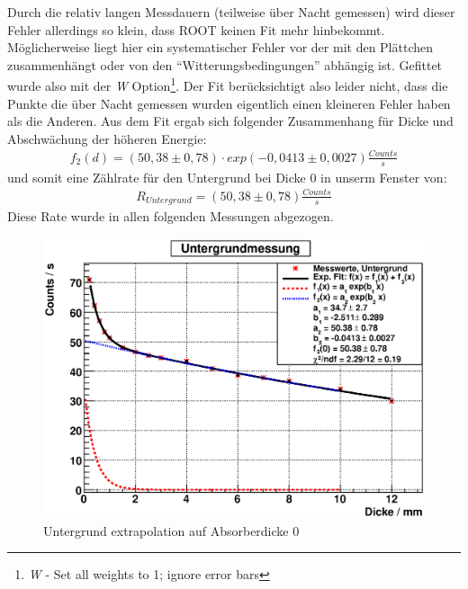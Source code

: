 \documentclass[12pt]{article}
\begin{document}
Durch die relativ langen Messdauern (teilweise über Nacht gemessen) wird dieser Fehler allerdings so klein, dass ROOT keinen Fit mehr hinbekommt.
Möglicherweise liegt hier ein systematischer Fehler vor der mit den Plättchen zusammenhängt oder von den ``Witterungsbedingungen'' abhängig ist.
Gefittet wurde also mit der \textit{W} Option\footnote{\textit{W} - Set all weights to 1; ignore error bars}. Der Fit berücksichtigt also leider nicht, dass die Punkte die über Nacht gemessen wurden eigentlich einen kleineren Fehler haben als die Anderen. Aus dem Fit ergab sich folgender Zusammenhang für Dicke und Abschwächung der höheren Energie:
\begin{align*}
 f_2 (d) = (50,38 \pm 0,78) \cdot exp (-0,0413 \pm 0,0027) \frac{Counts}{s}
\end{align*}
 und somit eine Zählrate für den Untergrund bei Dicke 0 in unserm Fenster von:
\begin{align*}
 R_{Untergrund} = (50,38 \pm 0,78) \frac{Counts}{s} 
\end{align*}
Diese Rate wurde in allen folgenden Messungen abgezogen.
       

\begin{figure}[H]
 \includegraphics[width=0.9\linewidth]{pictures/untergrund.eps}
 \caption{Untergrund extrapolation auf Absorberdicke 0}
\end{figure}
\end{document}

